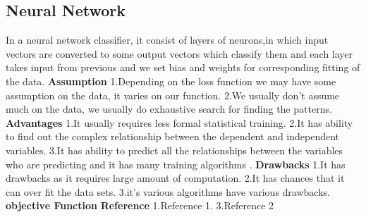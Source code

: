 \documentclass{article}
\begin{document}
\subsection{Neural Network}
In a neural network classifier, it consist of layers of neurons,in which input vectors are converted to some output vectors which classify them and each layer takes input from previous and we set bias and weights for corresponding fitting of the data.\newline
\textbf{Assumption}\newline
1.Depending on the loss function we may have some assumption on the data, it varies on our function.\newline
2.We usually don't assume much on the data, we usually do exhaustive search for finding the patterns.\newline
\textbf{Advantages}\newline
1.It usually requires less formal statistical training.\newline
2.It has ability to find out the complex relationship between the dependent and independent variables.\newline
3.It has ability to predict all the relationships between the variables who are predicting and it has many training algorithms .\newline
\textbf{Drawbacks}\newline
1.It has drawbacks as it requires large amount of computation.\newline
2.It has chances that it can over fit the data sets.\newline
3.it's various algorithms have various drawbacks. \newline
\textbf{objective Function}\newline
\textbf{Reference}\newline
1.Reference 1.\newline
3.Reference 2 \newline
\end{document}
